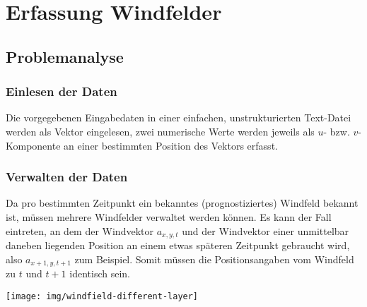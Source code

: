 
\section{Erfassung Windfelder}\label{s:windfields}

\subsection{Problemanalyse}
\subsubsection{Einlesen der Daten}
Die vorgegebenen Eingabedaten in einer einfachen, unstrukturierten
Text-Datei werden als Vektor eingelesen, zwei numerische Werte werden
jeweils als $u$- bzw. $v$-Komponente an einer bestimmten Position des
Vektors erfasst.

\subsubsection{Verwalten der Daten}
Da pro bestimmten Zeitpunkt ein bekanntes (prognostiziertes) Windfeld
bekannt ist, müssen mehrere Windfelder verwaltet werden können. Es kann
der Fall eintreten, an dem der Windvektor $a_{x,y,t}$ und der Windvektor
einer unmittelbar daneben liegenden Position an einem etwas späteren
Zeitpunkt gebraucht wird, also $a_{x+1,y,t+1}$ zum Beispiel. Somit
müssen die Positionsangaben vom Windfeld zu $t$ und $t+1$ identisch
sein. 

\texttt{[image: img/windfield-different-layer]}
